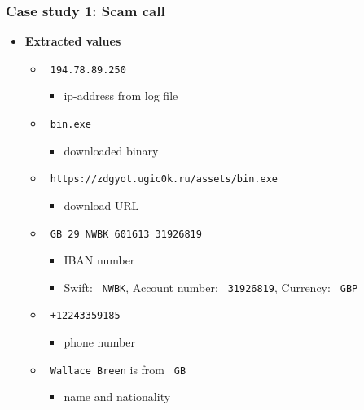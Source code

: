 \begin{frame}
    \frametitle{Case study 1: Scam call}
    \begin{itemize}
        \item[] \textbf{Extracted values}
        \begin{itemize}
            \item \texttt{\color{black} 194.78.89.250}
            \begin{itemize}
                \item ip-address from log file
            \end{itemize}
            \item \texttt{\color{black} bin.exe}
            \begin{itemize}
                \item downloaded binary
            \end{itemize}
            \item \texttt{\color{black} https://zdgyot.ugic0k.ru/assets/bin.exe}
            \begin{itemize}
                \item download URL
            \end{itemize}
            \item \texttt{\color{black} GB 29 NWBK 601613 31926819 }
            \begin{itemize}
                \item IBAN number
                \item Swift: \texttt{\color{black} NWBK}, Account number: \texttt{\color{black} 31926819}, Currency: \texttt{\color{black} GBP}
            \end{itemize}
            \item \texttt{\color{black} +12243359185}
            \begin{itemize}
                \item phone number
            \end{itemize}
            \item \texttt{\color{black} Wallace Breen} is from \texttt{\color{black} GB}
            \begin{itemize}
                \item name and nationality
            \end{itemize}
        \end{itemize}
    \end{itemize}

\end{frame}


